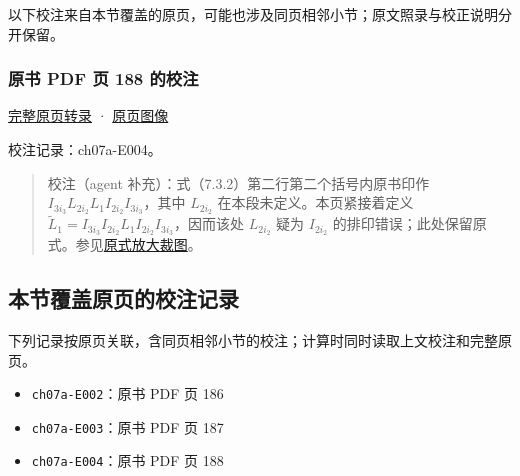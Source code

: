 \documentclass[
  10pt,
  fontset=fandol]{ctexart}
\providecommand{\tightlist}{%
  \setlength{\itemsep}{0pt}\setlength{\parskip}{0pt}}
\begin{document}
以下校注来自本节覆盖的原页，可能也涉及同页相邻小节；原文照录与校正说明分开保留。

\subsubsection{原书 PDF 页 188 的校注}\label{ux539fux4e66-pdf-ux9875-188-ux7684ux6821ux6ce8}

\href{../pages/pdf-188.md}{完整原页转录} · \href{../../source-images/pdf-188.jpeg}{原页图像}

校注记录：ch07a-E004。

\begin{quote}
校注（agent 补充）：式（7.3.2）第二行第二个括号内原书印作 \(I_{3i_3}L_{2i_2}L_1I_{2i_2}I_{3i_3}\)，其中 \(L_{2i_2}\) 在本段未定义。本页紧接着定义 \(\widetilde{L}_1=I_{3i_3}I_{2i_2}L_1I_{2i_2}I_{3i_3}\)，因而该处 \(L_{2i_2}\) 疑为 \(I_{2i_2}\) 的排印错误；此处保留原式。参见\href{../assets/ch07a/pdf-188-permutation-detail.png}{原式放大裁图}。
\end{quote}

\subsection{本节覆盖原页的校注记录}\label{ux672cux8282ux8986ux76d6ux539fux9875ux7684ux6821ux6ce8ux8bb0ux5f55}

下列记录按原页关联，含同页相邻小节的校注；计算时同时读取上文校注和完整原页。

\begin{itemize}
\tightlist
\item
  \texttt{ch07a-E002}：原书 PDF 页 186
\item
  \texttt{ch07a-E003}：原书 PDF 页 187
\item
  \texttt{ch07a-E004}：原书 PDF 页 188
\end{itemize}
\end{document}
